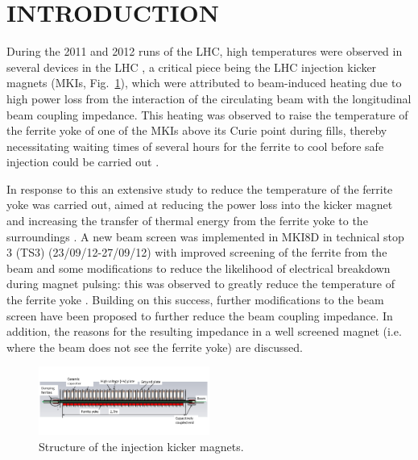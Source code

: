 \documentclass{JAC2003}
\begin{document}
% 

\section{INTRODUCTION}

During the 2011 and 2012 runs of the LHC, high temperatures were observed in several devices in the LHC  \cite{metral_cham2012}, a critical piece being the LHC injection kicker magnets (MKIs, Fig.~\ref{fig:mkiStruct}), which were attributed to beam-induced heating due to high power loss from the interaction of the circulating beam with the longitudinal beam coupling impedance. This heating was observed to raise the temperature of the ferrite yoke of one of the MKIs above its Curie point during fills, thereby necessitating waiting times of several hours for the ferrite to cool before safe injection could be carried out \cite{mki-heating}. 

In response to this an extensive study to reduce the temperature of the ferrite yoke was carried out, aimed at reducing the power loss into the kicker magnet and increasing the transfer of thermal energy from the ferrite yoke to the surroundings \cite{mki-heatingTemp}. A new beam screen was implemented in MKI8D in technical stop 3 (TS3) (23/09/12-27/09/12) with improved screening of the ferrite from the beam and some modifications to reduce the likelihood of electrical breakdown during magnet pulsing: this was observed to greatly reduce the temperature of the ferrite yoke \cite{mki-heatingTemp}. Building on this success, further modifications to the beam screen have been proposed to further reduce the beam coupling impedance. In addition, the reasons for the resulting impedance in a well screened magnet (i.e. where the beam does not see the ferrite yoke) are discussed. 

\begin{figure}
\includegraphics[width=0.5\textwidth]{MKICrossSectionYZ.pdf}
\caption{Structure of the injection kicker magnets.}
\label{fig:mkiStruct}
\end{figure}
\end{document}
